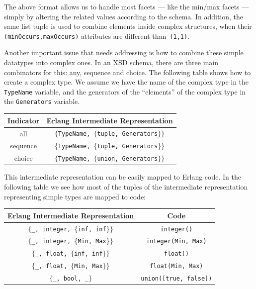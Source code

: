 \documentclass[submission,copyright]{eptcs}
\begin{document}
The above format allows us to handle most facets --- like the min/max facets ---
simply by altering the related values according to the schema. In addition, the
same list tuple is used to combine elements inside complex structures, when
their \texttt{(minOccurs,maxOccurs)} attributes are different than~\texttt{(1,1)}.

Another important issue that needs addressing is how to combine these
simple datatypes into complex ones. In an XSD schema, there are three
main combinators for this: any, sequence and choice. The following
table shows how to create a complex type. We assume we have the name
of the complex type in the \texttt{TypeName} variable, and the
generators of the ``elements'' of the complex type in the
\texttt{Generators} variable.

\begin{center}\footnotesize
  \begin{tabular}{cc}
    \toprule
    Indicator & Erlang Intermediate Representation \\
    \midrule
    all & \texttt{$\{$TypeName, $\{$tuple, Generators$\}\}$}\\
    sequence & \texttt{$\{$TypeName, $\{$tuple, Generators$\}\}$}\\
    choice & \texttt{$\{$TypeName, $\{$union, Generators$\}\}$}\\
    \bottomrule
  \end{tabular}
\end{center}

This intermediate representation can be easily mapped to Erlang code.
In the following table we see how most of the tuples of the
intermediate representation representing simple types are mapped to
code:
\begin{center}\footnotesize
  \begin{tabular}{cc}
    \toprule
    Erlang Intermediate Representation & Code\\
    \midrule
    \texttt{$\{$\_, integer, $\{$inf, inf$\}\}$} & \texttt{integer()}\\
    \texttt{$\{$\_, integer, $\{$Min, Max$\}\}$} & \texttt{integer(Min, Max)}\\
    \texttt{$\{$\_, float, $\{$inf, inf$\}\}$} & \texttt{float()}\\
    \texttt{$\{$\_, float, $\{$Min, Max$\}\}$} & \texttt{float(Min, Max)}\\
    \texttt{$\{$\_, bool, \_$\}$} & \texttt{union([true, false])}\\
    \bottomrule
  \end{tabular}
\end{center}
\end{document}
